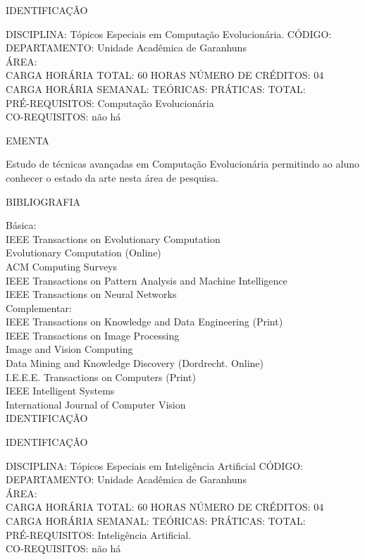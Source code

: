\documentclass[
	12pt,				%
	openright,			%
  oneside,     %
	a4paper,			%
	english,			%
	french,				%
	spanish,			%
	brazil				%
	]{abntex2}
\begin{document}
\begin{apendicesenv}
\newpage IDENTIFICAÇÃO

DISCIPLINA: Tópicos Especiais em Computação Evolucionária. CÓDIGO:\\ 
DEPARTAMENTO: Unidade Acadêmica de Garanhuns\\ 
ÁREA: \\
CARGA HORÁRIA TOTAL: 60 HORAS NÚMERO DE CRÉDITOS: 04\\
CARGA HORÁRIA SEMANAL: TEÓRICAS: PRÁTICAS: TOTAL: \\
PRÉ-REQUISITOS: Computação Evolucionária\\
CO-REQUISITOS: não há

EMENTA 

Estudo de técnicas avançadas em Computação Evolucionária permitindo ao
aluno conhecer o estado da arte nesta área de pesquisa.

BIBLIOGRAFIA 

Básica:\\
IEEE Transactions on Evolutionary Computation\\
Evolutionary Computation (Online)\\
ACM Computing Surveys\\
IEEE Transactions on Pattern Analysis and Machine Intelligence\\
IEEE Transactions on Neural Networks\\
Complementar:\\
IEEE Transactions on Knowledge and Data Engineering (Print)\\
IEEE Transactions on Image Processing\\
Image and Vision Computing\\
Data Mining and Knowledge Discovery (Dordrecht. Online)\\
I.E.E.E. Transactions on Computers (Print)\\
IEEE Intelligent Systems\\
International Journal of Computer Vision\\

\newpage IDENTIFICAÇÃO

IDENTIFICAÇÃO 

DISCIPLINA: Tópicos Especiais em Inteligência Artificial CÓDIGO:\\ 
DEPARTAMENTO: Unidade Acadêmica de Garanhuns\\
ÁREA: \\
CARGA HORÁRIA TOTAL: 60 HORAS NÚMERO DE CRÉDITOS: 04\\
CARGA HORÁRIA SEMANAL: TEÓRICAS: PRÁTICAS: TOTAL: \\
PRÉ-REQUISITOS: Inteligência Artificial.\\
CO-REQUISITOS: não há


\end{apendicesenv}
\end{document}
